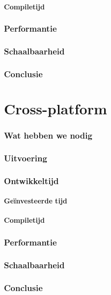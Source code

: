 \paragraph{Compiletijd}

\subsubsection{Performantie}

\subsubsection{Schaalbaarheid}

\subsubsection{Conclusie}


\section{Cross-platform}
\subsubsection{Wat hebben we nodig}

\subsubsection{Uitvoering}

\subsubsection{Ontwikkeltijd}

\paragraph{Geïnvesteerde tijd}

\paragraph{Compiletijd}

\subsubsection{Performantie}

\subsubsection{Schaalbaarheid}

\subsubsection{Conclusie}






















